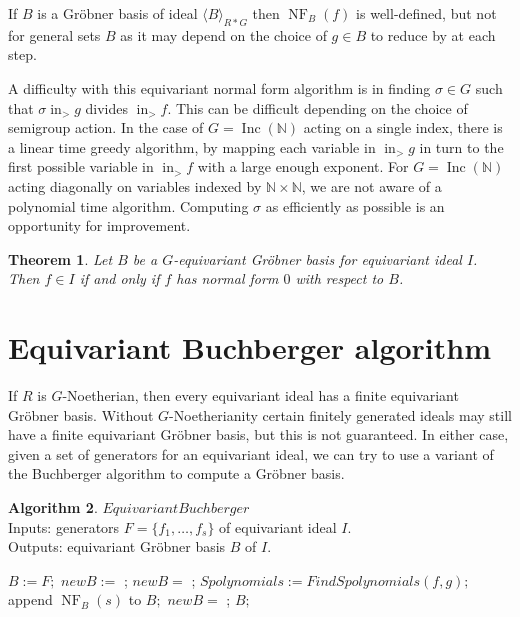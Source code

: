 \documentclass{amsart}
\newtheorem{theorem}{Theorem}[section]
\theoremstyle{definition}
\newtheorem{algorithm}[theorem]{Algorithm}
\theoremstyle{remark}
\numberwithin{equation}{section}
\newcommand{\B}[1]{\mathbb #1}
\newcommand{\<}{\langle}
\renewcommand{\>}{\rangle}
\newcommand{\ideal}[1]{\langle #1 \rangle}
\newcommand{\LT}{\operatorname{in}_>}
\newcommand{\Inc}{\operatorname{Inc}(\B N)}
\newcommand{\NF}{\operatorname{NF}}
\begin{document}
If $B$ is a Gr\"obner basis of ideal $\ideal{B}_{R*G}$ then $\NF_B(f)$ is well-defined, but not for general sets $B$ as it may depend on the choice of $g \in B$ to reduce by at each step.

A difficulty with this equivariant normal form algorithm is in finding $\sigma \in G$ such that $\sigma \LT g$ divides $\LT f$.  This can be difficult depending on the choice of semigroup action.  In the case of $G = \Inc$ acting on a single index, there is a linear time greedy algorithm, by mapping each variable in $\LT g$ in turn to the first possible variable in $\LT f$ with a large enough exponent.  For $G = \Inc$ acting diagonally on variables indexed by $\B N \times \B N$, we are not aware of a polynomial time algorithm.  Computing $\sigma$ as efficiently as possible is an opportunity for improvement.

\begin{theorem}
Let $B$ be a $G$-equivariant Gr\"obner basis for equivariant ideal $I$.  Then $f \in I$ if and only if $f$ has normal form $0$ with respect to $B$.
\end{theorem}

\section{Equivariant Buchberger algorithm}
If $R$ is $G$-Noetherian, then every equivariant ideal has a finite equivariant Gr\"obner basis.  Without $G$-Noetherianity certain finitely generated ideals may still have a finite equivariant Gr\"obner basis, but this is not guaranteed.  In either case, given a set of generators for an equivariant ideal, we can try to use a variant of the Buchberger algorithm to compute a Gr\"obner basis.

\begin{algorithm}
$EquivariantBuchberger$ \\
Inputs: generators $F = \{f_1,\ldots,f_s\}$ of equivariant ideal $I$.\\
Outputs: equivariant Gr\"obner basis $B$ of $I$.
\begin{algorithmic}
\STATE $B := F;$
\STATE $newB := $ \TRUE;
	\STATE $newB = $ \FALSE;
		\STATE $Spolynomials := FindSpolynomials(f,g);$
			\IF{$\NF_B(s) \neq 0$}
				\STATE append $\NF_B(s)$ to $B;$
				\STATE $newB = $ \TRUE;
			\ENDIF
		\ENDFOR
	\ENDFOR
\ENDWHILE
\RETURN $B;$
\end{algorithmic}
\end{algorithm}
\end{document}
